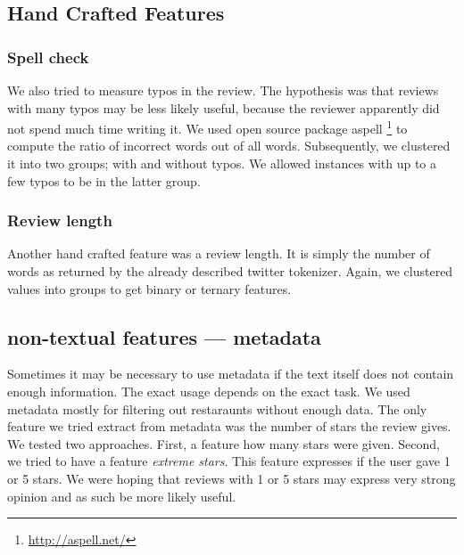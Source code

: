
\subsection{}


\subsection{Hand Crafted Features}

\subsubsection{Spell check}

We also tried to measure typos in the review.
The hypothesis was that reviews with many typos may be less likely useful,
because the reviewer apparently did not spend much time writing it.
We used open source package aspell \footnote{\url{http://aspell.net/}}
to compute the ratio of incorrect words out of all words.
Subsequently, we clustered it into two groups; with and without typos.
We allowed instances with up to a few typos to be in the latter group.

\subsubsection{Review length}

Another hand crafted feature was a review length.
It is simply the number of words as returned by the already described twitter tokenizer.
Again, we clustered values into groups to get binary or ternary features.


\subsection{non-textual features --- metadata}

Sometimes it may be necessary to use metadata
if the text itself does not contain enough information.
The exact usage depends on the exact task.
We used metadata mostly for filtering out restaraunts without enough data.
The only feature we tried extract from metadata was the number of stars the review gives.
We tested two approaches.
First, a feature how many stars were given.
Second, we tried to have a feature \textit{extreme stars}.
This feature expresses if the user gave 1 or 5 stars. 
We were hoping that reviews with 1 or 5 stars may express very strong opinion
and as such be more likely useful.


